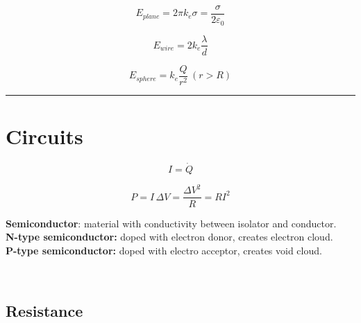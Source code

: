 \documentclass{form}
\begin{document}
\begin{center}
\begin{minipage}[c]{0.20\textwidth}
	\begin{equation*}
		E_{plane}=2\pi k_e \sigma=\frac{\sigma}{2 \varepsilon_0}
	\end{equation*}
\end{minipage}
\begin{minipage}[c]{0.20\textwidth}
	\begin{equation*}
		E_{wire}=2 k_e \frac{\lambda}{d}
	\end{equation*}
\end{minipage}
\begin{minipage}[c]{0.25\textwidth}
	\begin{equation*}
		E_{sphere}=k_e \frac{Q}{r^2}~(r>R)
	\end{equation*}
\end{minipage}
\end{center}
\noindent\rule{\textwidth}{0.4pt}
\begin{minipage}[c]{0.10\textwidth}
	\section*{Circuits}
\end{minipage}
\begin{minipage}[c]{0.06\textwidth}
	\begin{equation*}
		I=\dot{Q}
	\end{equation*}
\end{minipage}
\begin{minipage}[c]{0.22\textwidth}
	\begin{equation*}
		P=I\,\Delta V=\frac{\Delta V^2}{R}=RI^2
	\end{equation*}
\end{minipage}
\begin{minipage}[c]{0.59\textwidth}
	\textbf{Semiconductor}: material with conductivity between isolator and conductor.\\
	\textbf{N-type semiconductor:} doped with electron donor, creates electron cloud.\\
	\textbf{P-type semiconductor:} doped with electro acceptor, creates void cloud.
\end{minipage}\\
\begin{minipage}[c]{0.15\textwidth}
	\subsection*{Resistance}
\end{minipage}
\end{document}
